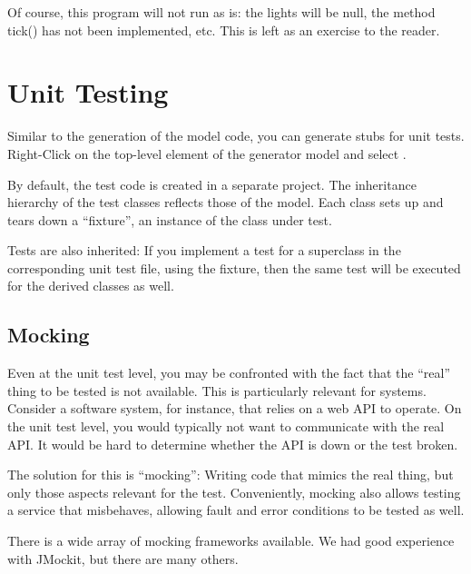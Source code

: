 Of course, this program will not run as is: the lights will be null, the method tick() has not been implemented, etc.  This is left as an exercise to the reader.

\section{Unit Testing}

Similar to the generation of the model code, you can generate stubs for unit tests. Right-Click on the top-level element of the generator model and select .

By default, the test code is created in a separate project.  The inheritance hierarchy of the test classes reflects those of the model.  Each class sets up and tears down a ``fixture'', an instance of the class under test.

Tests are also inherited: If you implement a test for a superclass in the corresponding unit test file, using the fixture, then the same test will be executed for the derived classes as well.

\subsection{Mocking}

Even at the unit test level, you may be confronted with the fact that the ``real'' thing to be tested is not available.  This is particularly relevant for systems.  Consider a software system, for instance, that relies on a web API to operate.  On the unit test level, you would typically not want to communicate with the real API.  It would be hard to determine whether the API is down or the test broken.

The solution for this is ``mocking'': Writing code that mimics the real thing, but only those aspects relevant for the test.  Conveniently, mocking also allows testing a service that misbehaves, allowing fault and error conditions to be tested as well.

There is a wide array of mocking frameworks available.  We had good experience with JMockit, but there are many others.

